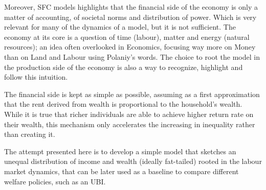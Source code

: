 Moreover, SFC models highlights that the financial side of the economy is only a matter of accounting, of societal norms and distribution of power.
Which is very relevant for many of the dynamics of a model, but it is not sufficient.
The economy at its core is a question of time (labour), matter and energy (natural resources); an idea often overlooked in Economics, focusing way more on Money than on Land and Labour using Polaniy's words.
The choice to root the model in the production side of the economy is also a way to recognize, highlight and follow this intuition.

The financial side is kept as simple as possible, assuming as a first approximation that the rent derived from wealth is proportional to the household's wealth.
While it is true that richer individuals are able to achieve higher return rate on their wealth, this mechanism only accelerates the increasing in inequality rather than creating it.

The attempt presented here is to develop a simple model that sketches an unequal distribution of income and wealth (ideally fat-tailed) rooted in the labour market dynamics, that can be later used as a baseline to compare different welfare policies, such as an UBI.
